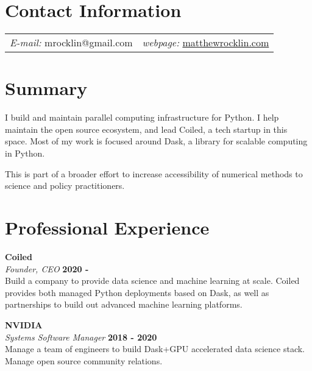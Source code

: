 \documentclass[margin,line]{res}
\begin{document}
\newcommand{\link}[1]{\texttt{#1}}
\providecommand{\tightlist}{%
      \setlength{\itemsep}{0pt}\setlength{\parskip}{0pt}}



\begin{resume}
\section{\sc Contact Information}
\vspace{.05in}
\begin{tabular}{@{}p{2in}p{4in}}
{\it E-mail:}  mrocklin@gmail.com   & {\it webpage:} \href{https://matthewrocklin.com}{matthewrocklin.com} \\
\end{tabular}


\section{\sc Summary}

I build and maintain parallel computing infrastructure for Python.
I help maintain the open source ecosystem,
and lead Coiled, a tech startup in this space.
Most of my work is focused around Dask, a library for scalable computing in Python.

This is part of a broader effort to increase accessibility of numerical methods to science and policy practitioners.

\section{\sc Professional Experience}

{\bf Coiled } \\
{\em Founder, CEO } \hfill {\bf 2020 - }\\
Build a company to provide data science and machine learning at scale.
Coiled provides both managed Python deployments based on Dask,
as well as partnerships to build out advanced machine learning platforms.

{\bf NVIDIA} \\
{\em Systems Software Manager} \hfill {\bf 2018 - 2020}\\
Manage a team of engineers to build Dask+GPU accelerated data science stack.
Manage open source community relations.


\end{resume}
\end{document}
